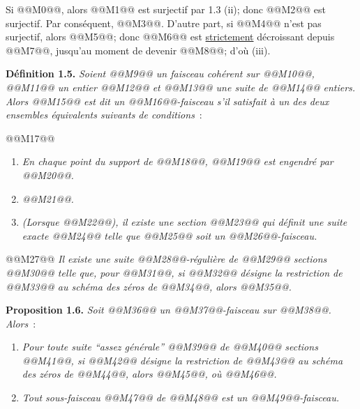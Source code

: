 
Si @@M0@@,
alors @@M1@@ est surjectif par 1.3 (ii); donc @@M2@@ est surjectif. Par conséquent, @@M3@@. D'autre part, si @@M4@@ n'est pas surjectif, alors @@M5@@; donc @@M6@@ est \uline{strictement} décroissant depuis @@M7@@, jusqu'au moment de devenir @@M8@@; d'où (iii).

\textbf{Définition 1.5.} \emph{Soient @@M9@@ un faisceau cohérent sur @@M10@@, @@M11@@ un entier @@M12@@ et @@M13@@ une suite de @@M14@@ entiers. Alors @@M15@@ est dit un \emph{@@M16@@-faisceau} s'il satisfait à un des deux ensembles équivalents suivants de conditions}~:

@@M17@@
\begin{enumerate}[label=(\roman*)]
\item \emph{En chaque point du support de @@M18@@, @@M19@@ est engendré par @@M20@@.}
\item \emph{@@M21@@.}
\item \emph{(Lorsque @@M22@@), il existe une section @@M23@@ qui définit une suite exacte @@M24@@ telle que @@M25@@ soit un @@M26@@-faisceau.}
\end{enumerate}

@@M27@@ \emph{Il existe une suite @@M28@@-régulière de @@M29@@ sections @@M30@@ telle que, pour @@M31@@, si @@M32@@ désigne la restriction de @@M33@@ au schéma des zéros de @@M34@@, alors @@M35@@.}

\textbf{Proposition 1.6.} \emph{Soit @@M36@@ un @@M37@@-faisceau sur @@M38@@. Alors}~:
\begin{enumerate}[label=(\roman*)]
\item \emph{Pour toute suite ``assez générale'' @@M39@@ de @@M40@@ sections @@M41@@, si @@M42@@ désigne la restriction de @@M43@@ au schéma des zéros de @@M44@@, alors @@M45@@, où @@M46@@.}
\item \emph{Tout sous-faisceau @@M47@@ de @@M48@@ est un @@M49@@-faisceau.}
\end{enumerate}


